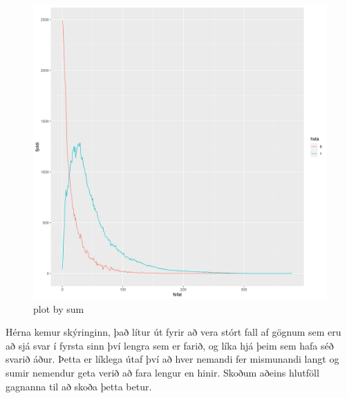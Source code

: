 \documentclass[
]{article}
\begin{document}
\begin{figure}
\centering
\includegraphics{Imgsimplify/plotbyamount.png}
\caption{plot by sum}
\end{figure}

Hérna kemur skýringinn, það lítur út fyrir að vera stórt fall af gögnum sem eru að sjá svar í fyrsta sinn því lengra sem er farið, og líka hjá þeim sem hafa séð svarið áður. Þetta er líklega útaf því að hver nemandi fer mismunandi langt og sumir nemendur geta verið að fara lengur en hinir. Skoðum aðeins hlutföll gagnanna til að skoða þetta betur.
\end{document}
